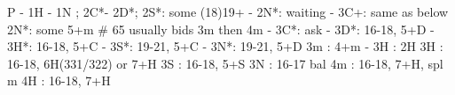P - 1H - 1N ; 2C*- 2D*; 
2S*: some (18)19+
   - 2N*: waiting
        - 3C+: same as below
2N*: some 5+m  # 65 usually bids 3m then 4m
   - 3C*: ask
        - 3D*: 16-18, 5+D
        - 3H*: 16-18, 5+C
        - 3S*: 19-21, 5+C
        - 3N*: 19-21, 5+D
3m : 4+m
   - 3H : 2H
3H : 16-18, 6H(331/322) or 7+H
3S : 16-18, 5+S
3N : 16-17 bal
4m : 16-18, 7+H, spl m
4H : 16-18, 7+H